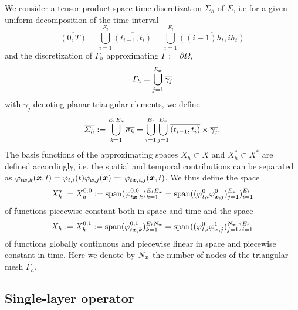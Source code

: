 \documentclass[a4paper,11pt]{article}
\begin{document}
We consider a tensor product space-time discretization $\Sigma_h$ of $\Sigma$, i.e for a given uniform decomposition of the time interval
\begin{equation*}
  \overline{(0,T)} = \bigcup_{i=1}^{E_t} \overline{(t_{i-1}, t_i)} = \bigcup_{i=1}^{E_t} \overline{((i-1)h_t, i h_t)}
\end{equation*}
and the discretization of $\Gamma_h$ approximating $\Gamma := \partial\Omega$,
\begin{equation*}
  \Gamma_h = \bigcup_{j=1}^{E_{{\bm{x}}}} \overline{\gamma_j}
\end{equation*}
with $\gamma_j$ denoting planar triangular elements, we define
\begin{equation*}
  \overline{\Sigma_h} := \bigcup_{k=1}^{E_t E_{{{\bm{x}}}}} \overline{\sigma_k} = \bigcup_{i=1}^{E_t} \bigcup_{j=1}^{E_{{\bm{x}}}} \overline{(t_{i-1}, t_i)} \times \overline{\gamma_j}.
\end{equation*}
The basis functions of the approximating spaces $X_h \subset X$ and $X^\ast_h \subset X^\ast$ are defined accordingly, i.e. the spatial and temporal contributions can be separated as $\varphi_{t{{\bm{x}}},k}({{\bm{x}}},t) = \varphi_{t,i} (t) \varphi_{{{\bm{x}}},j} ({{\bm{x}}}) =: \varphi_{t{{\bm{x}}},i,j}({{\bm{x}}},t)$. We thus define the space 
\begin{equation*}
  X^\ast_h := X_h^{0,0} := \operatorname{span} (\varphi^{0,0}_{t{{\bm{x}}},k})_{k=1}^{E_t E_{{{\bm{x}}}}} = \operatorname{span} ((\varphi^0_{t,i}\varphi^0_{{{\bm{x}}},j})_{j=1}^{E_{{{\bm{x}}}}})_{i=1}^{E_t}
\end{equation*}
of functions piecewise constant both in space and time and the space  
\begin{equation*}
  X_h := X_h^{0,1} := \operatorname{span} (\varphi^{0,1}_{t{{\bm{x}}},k})_{k=1}^{E_t N_{{\bm{x}}}} = \operatorname{span} ((\varphi^0_{t,i}\varphi^1_{{{\bm{x}}},j})_{j=1}^{N_{{{\bm{x}}}}})_{i=1}^{E_t}
\end{equation*} 
of functions globally continuous and piecewise linear in space and piecewise constant in time. Here we denote by $N_{{\bm{x}}}$ the number of nodes of the triangular mesh $\Gamma_h$.

\subsection{Single-layer operator}
\end{document}
